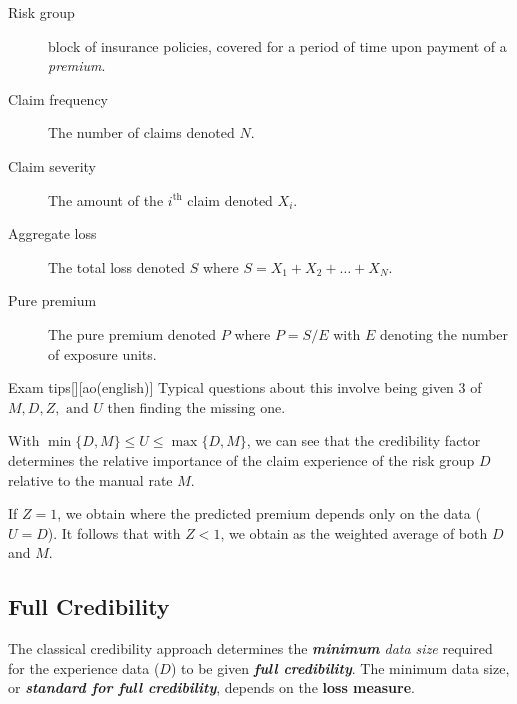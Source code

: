 \documentclass[english]{article}
\begin{document}
\begin{multicols*}{2}
\begin{distributions}[Terminology]
\begin{description}
	\item[Risk group]	block of insurance policies, covered for a period of time upon payment of a \textit{premium}.
	\item[Claim frequency]	The number of claims denoted $N$.
	\item[Claim severity]	The amount of the $i^{\text{th}}$ claim denoted $X_{i}$.
	\item[Aggregate loss]	The total loss denoted $S$ where $S = X_{1} + X_{2} + \hdots + X_{N}$.
	\item[Pure premium]	The pure premium denoted $P$ where $P = S/E$ with $E$ denoting the number of exposure units.
\end{description}
\end{distributions}

\begin{definitionGENERAL}{Exam tips}[][ao(english)]
Typical questions about this involve being given 3 of $M, D, Z, \text{ and } U$ then finding the missing one.
\end{definitionGENERAL}


\begin{rappel_enhanced}[Context]
With $\min\{D, M\} \leq U \leq \max\{D, M\}$, we can see that the credibility factor determines the relative importance of the claim experience of the risk group $D$ relative to the manual rate $M$.

\bigskip

If $Z = 1$, we obtain \textit{\underline{}} where the predicted premium depends only on the data ($U = D$). It follows that with $Z < 1$, we obtain \textit{\underline{}} as the weighted average of both $D$ and $M$.
\end{rappel_enhanced}


\subsection{Full Credibility}\label{subsec:FullCred}
\begin{rappel_enhanced}[Contexte]
The classical credibility approach determines the \textit{\textbf{minimum} data size} required for the experience data ($D$) to be given \textbf{\textit{full credibility}}. The minimum data size, or \textit{\textbf{standard for full credibility}}, depends on the \textbf{loss measure}.
\end{rappel_enhanced}



\end{multicols*}
\end{document}
